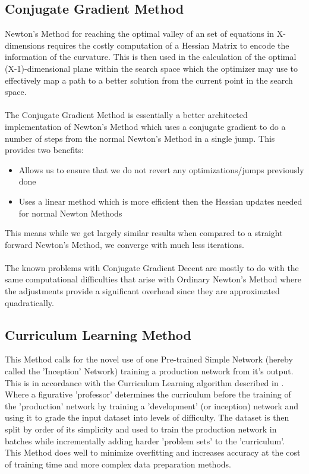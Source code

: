 \documentclass[conference]{IEEEtran}
\begin{document}
\subsection{Conjugate Gradient Method}
Newton's Method for reaching the optimal valley of an set of equations in X-dimensions requires the costly computation of a Hessian Matrix to encode the information of the curvature. This is then used in the calculation of the optimal (X-1)-dimensional plane within the search space which the optimizer may use to effectively map a path to a better solution from the current point in the search space.\cite{supervised-learning-slides}
\\\\
The Conjugate Gradient Method is essentially a better architected implementation of Newton's Method which uses a conjugate gradient\cite{supervised-learning-slides} to do a number of steps from the normal Newton's Method in a single jump. This provides two benefits:
\begin{itemize}
	\item Allows us to ensure that we do not revert any optimizations/jumps previously done
	\item Uses a linear method which is more efficient then the Hessian updates needed for normal Newton Methods
\end{itemize}
This means while we get largely similar results when compared to a straight forward Newton's Method, we converge with much less iterations.
\\\\
The known problems with Conjugate Gradient Decent are mostly to do with the same computational difficulties that arise with Ordinary Newton's Method where the adjustments provide a significant overhead since they are approximated quadratically.

\subsection{Curriculum Learning Method}

This Method calls for the novel use of one Pre-trained Simple Network (hereby called the 'Inception' Network) training a production network from it's output.
This is in accordance with the Curriculum Learning algorithm described in \cite{on-the-power}. Where a figurative 'professor' determines the curriculum before the training of the 'production' network by training a 'development' (or inception) network and using it to grade the input dataset into levels of difficulty.
The dataset is then split by order of its simplicity and used to train the production network in batches while incrementally adding harder 'problem sets' to the 'curriculum'.
\\
This Method does well to minimize overfitting and increases accuracy at the cost of training time and more complex data preparation methods.
\end{document}
